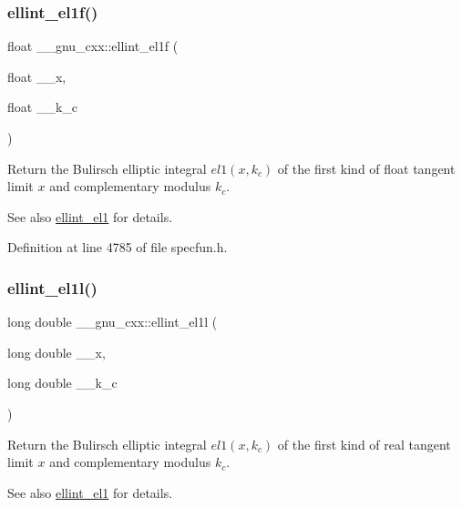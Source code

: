\subsubsection{\texorpdfstring{ellint\+\_\+el1f()}{ellint\_el1f()}}
{\footnotesize\ttfamily float \+\_\+\+\_\+gnu\+\_\+cxx\+::ellint\+\_\+el1f (\begin{DoxyParamCaption}\item[{float}]{\+\_\+\+\_\+x,  }\item[{float}]{\+\_\+\+\_\+k\+\_\+c }\end{DoxyParamCaption})\hspace{0.3cm}{\ttfamily [inline]}}

Return the Bulirsch elliptic integral $ el1(x,k_c) $ of the first kind of {\ttfamily float} tangent limit $ x $ and complementary modulus $ k_c $.

\begin{DoxySeeAlso}{See also}
\hyperlink{group__gnu__math__spec__func_ga510b1e51e7d3bc937ed1b4c2f57492e4}{ellint\+\_\+el1} for details. 
\end{DoxySeeAlso}


Definition at line 4785 of file specfun.\+h.

\mbox{\label{group__gnu__math__spec__func_gaeed1201e421be410460739048cba5cd8}} 
\subsubsection{\texorpdfstring{ellint\+\_\+el1l()}{ellint\_el1l()}}
{\footnotesize\ttfamily long double \+\_\+\+\_\+gnu\+\_\+cxx\+::ellint\+\_\+el1l (\begin{DoxyParamCaption}\item[{long double}]{\+\_\+\+\_\+x,  }\item[{long double}]{\+\_\+\+\_\+k\+\_\+c }\end{DoxyParamCaption})\hspace{0.3cm}{\ttfamily [inline]}}

Return the Bulirsch elliptic integral $ el1(x,k_c) $ of the first kind of real tangent limit $ x $ and complementary modulus $ k_c $.

\begin{DoxySeeAlso}{See also}
\hyperlink{group__gnu__math__spec__func_ga510b1e51e7d3bc937ed1b4c2f57492e4}{ellint\+\_\+el1} for details. 
\end{DoxySeeAlso}


